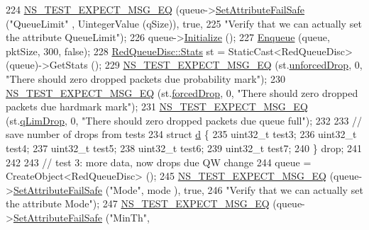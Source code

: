 \begin{DoxyCode}
224   \hyperlink{group__testing_ga7304ba46a28d8cf08dfdfd6499cf7068}{NS\_TEST\_EXPECT\_MSG\_EQ} (queue->\hyperlink{classns3_1_1ObjectBase_aa7d333004e970f925a4ed5df275541b5}{SetAttributeFailSafe} (\textcolor{stringliteral}{"QueueLimit"}
      , UintegerValue (qSize)), \textcolor{keyword}{true},
225                          \textcolor{stringliteral}{"Verify that we can actually set the attribute QueueLimit"});
226   queue->\hyperlink{classns3_1_1Object_af4411cb29971772fcd09203474a95078}{Initialize} ();
227   \hyperlink{classRedQueueDiscTestCase_a231b433374e4485d83bcca3088685e31}{Enqueue} (queue, pktSize, 300, \textcolor{keyword}{false});
228   \hyperlink{structns3_1_1RedQueueDisc_1_1Stats}{RedQueueDisc::Stats} st = StaticCast<RedQueueDisc> (queue)->GetStats ();
229   \hyperlink{group__testing_ga7304ba46a28d8cf08dfdfd6499cf7068}{NS\_TEST\_EXPECT\_MSG\_EQ} (st.\hyperlink{structns3_1_1RedQueueDisc_1_1Stats_a242027f6eb7d30e2cd636c52080e2c73}{unforcedDrop}, 0, \textcolor{stringliteral}{"There should zero dropped
       packets due probability mark"});
230   \hyperlink{group__testing_ga7304ba46a28d8cf08dfdfd6499cf7068}{NS\_TEST\_EXPECT\_MSG\_EQ} (st.\hyperlink{structns3_1_1RedQueueDisc_1_1Stats_a56951fa215564c8d2e59aa046dc3e494}{forcedDrop}, 0, \textcolor{stringliteral}{"There should zero dropped
       packets due hardmark mark"});
231   \hyperlink{group__testing_ga7304ba46a28d8cf08dfdfd6499cf7068}{NS\_TEST\_EXPECT\_MSG\_EQ} (st.\hyperlink{structns3_1_1RedQueueDisc_1_1Stats_a2374b8b8386ad6e42435bf1b29109bad}{qLimDrop}, 0, \textcolor{stringliteral}{"There should zero dropped packets
       due queue full"});
232 
233   \textcolor{comment}{// save number of drops from tests}
234   \textcolor{keyword}{struct }\hyperlink{buildings__pathloss_8m_a9f9b934daed17a4d3613b6886ff4cf4b}{d} \{
235     uint32\_t test3;
236     uint32\_t test4;
237     uint32\_t test5;
238     uint32\_t test6;
239     uint32\_t test7;
240   \} drop;
241 
242 
243   \textcolor{comment}{// test 3: more data, now drops due QW change}
244   queue = CreateObject<RedQueueDisc> ();
245   \hyperlink{group__testing_ga7304ba46a28d8cf08dfdfd6499cf7068}{NS\_TEST\_EXPECT\_MSG\_EQ} (queue->\hyperlink{classns3_1_1ObjectBase_aa7d333004e970f925a4ed5df275541b5}{SetAttributeFailSafe} (\textcolor{stringliteral}{"Mode"}, mode
      ), \textcolor{keyword}{true},
246                          \textcolor{stringliteral}{"Verify that we can actually set the attribute Mode"});
247   \hyperlink{group__testing_ga7304ba46a28d8cf08dfdfd6499cf7068}{NS\_TEST\_EXPECT\_MSG\_EQ} (queue->\hyperlink{classns3_1_1ObjectBase_aa7d333004e970f925a4ed5df275541b5}{SetAttributeFailSafe} (\textcolor{stringliteral}{"MinTh"}, 

\end{DoxyCode}
